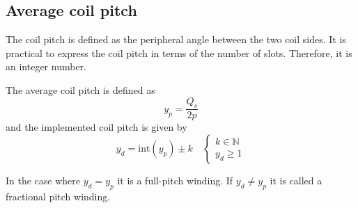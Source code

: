 \subsection{Average coil pitch}
The coil pitch is defined as the peripheral angle between the two coil sides. It is practical to express the coil pitch in terms of the number of slots. Therefore, it is an integer number. 
\begin{defth}
The average coil pitch is defined as
\begin{equation}
  \label{eqn:y_p}
  y_p = \frac{Q_s}{2p}
\end{equation}
and the implemented coil pitch is given by
\begin{equation}
  \label{eqn:y_d}
  y_d = \mbox{int}(y_p)\pm k
  \quad
  \begin{cases}
    k \in \mathbb{N} \\
    y_d \geq 1
  \end{cases}
\end{equation}
\end{defth}
In the case where $y_d=y_p$ it is a full-pitch winding. If $y_d \neq y_p$ it is called a fractional pitch winding. 

